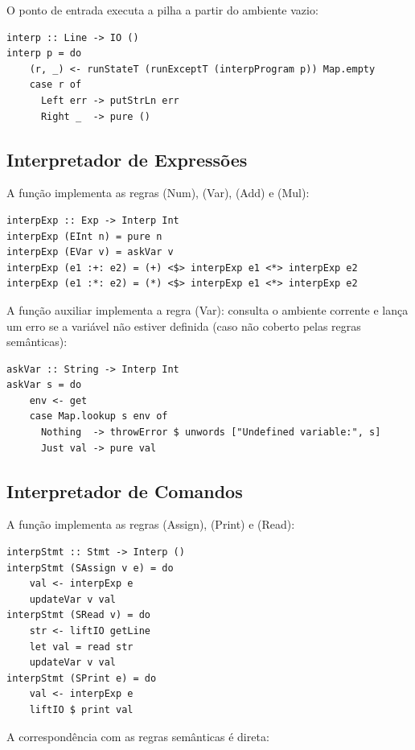 O ponto de entrada executa a pilha a partir do ambiente vazio:

\begin{verbatim}
interp :: Line -> IO ()
interp p = do
    (r, _) <- runStateT (runExceptT (interpProgram p)) Map.empty
    case r of
      Left err -> putStrLn err
      Right _  -> pure ()
\end{verbatim}

\subsection{Interpretador de Expressões}

A função  implementa as regras
(Num), (Var), (Add) e (Mul):

\begin{verbatim}
interpExp :: Exp -> Interp Int
interpExp (EInt n) = pure n
interpExp (EVar v) = askVar v
interpExp (e1 :+: e2) = (+) <$> interpExp e1 <*> interpExp e2
interpExp (e1 :*: e2) = (*) <$> interpExp e1 <*> interpExp e2
\end{verbatim}

A função auxiliar  implementa a regra
(Var): consulta o ambiente corrente e lança um erro se a variável não
estiver definida (caso não coberto pelas regras semânticas):

\begin{verbatim}
askVar :: String -> Interp Int
askVar s = do
    env <- get
    case Map.lookup s env of
      Nothing  -> throwError $ unwords ["Undefined variable:", s]
      Just val -> pure val
\end{verbatim}

\subsection{Interpretador de Comandos}

A função  implementa as regras
(Assign), (Print) e (Read):

\begin{verbatim}
interpStmt :: Stmt -> Interp ()
interpStmt (SAssign v e) = do
    val <- interpExp e
    updateVar v val
interpStmt (SRead v) = do
    str <- liftIO getLine
    let val = read str
    updateVar v val
interpStmt (SPrint e) = do
    val <- interpExp e
    liftIO $ print val
\end{verbatim}

A correspondência com as regras semânticas é direta:

